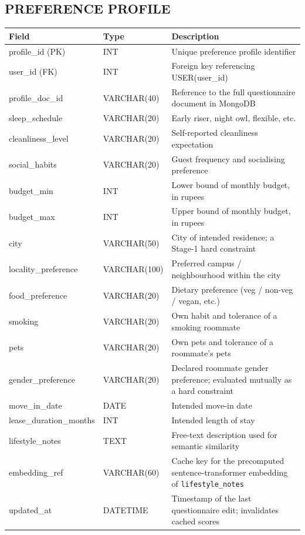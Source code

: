 \documentclass[12pt,a4paper]{report}
\begin{document}
\subsection*{PREFERENCE PROFILE}
\begin{longtable}{L{3.2cm}L{2.5cm}L{8.5cm}}
\toprule
\textbf{Field} & \textbf{Type} & \textbf{Description} \\
\midrule
\endhead
profile\_id (PK) & INT & Unique preference profile identifier \\
user\_id (FK) & INT & Foreign key referencing USER(user\_id) \\
profile\_doc\_id & VARCHAR(40) & Reference to the full questionnaire document in MongoDB \\
sleep\_schedule & VARCHAR(20) & Early riser, night owl, flexible, etc. \\
cleanliness\_level & VARCHAR(20) & Self-reported cleanliness expectation \\
social\_habits & VARCHAR(20) & Guest frequency and socialising preference \\
budget\_min & INT & Lower bound of monthly budget, in rupees \\
budget\_max & INT & Upper bound of monthly budget, in rupees \\
city & VARCHAR(50) & City of intended residence; a Stage-1 hard constraint \\
locality\_preference & VARCHAR(100) & Preferred campus / neighbourhood within the city \\
food\_preference & VARCHAR(20) & Dietary preference (veg / non-veg / vegan, etc.) \\
smoking & VARCHAR(20) & Own habit and tolerance of a smoking roommate \\
pets & VARCHAR(20) & Own pets and tolerance of a roommate's pets \\
gender\_preference & VARCHAR(20) & Declared roommate gender preference; evaluated mutually as a hard constraint \\
move\_in\_date & DATE & Intended move-in date \\
lease\_duration\_months & INT & Intended length of stay \\
lifestyle\_notes & TEXT & Free-text description used for semantic similarity \\
embedding\_ref & VARCHAR(60) & Cache key for the precomputed sentence-transformer embedding of \texttt{lifestyle\_notes} \\
updated\_at & DATETIME & Timestamp of the last questionnaire edit; invalidates cached scores \\
\bottomrule
\end{longtable}
\end{document}
